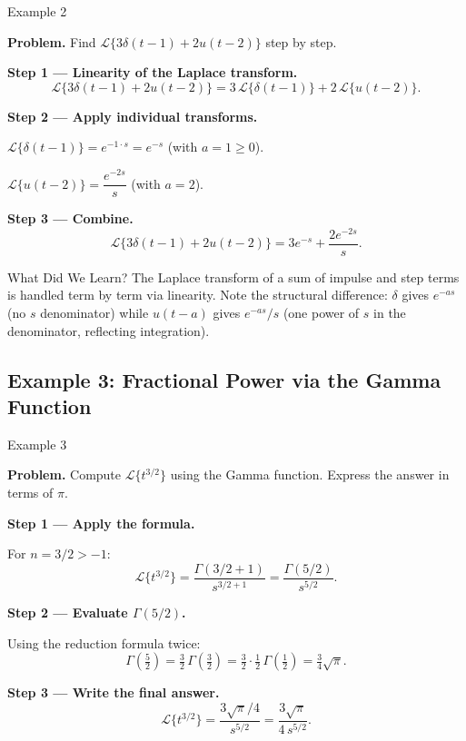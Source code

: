 \documentclass[12pt,a4paper]{article}
\begin{document}
\begin{infobox}{Example 2}

\textbf{Problem.} Find $\mathcal{L}\{3\delta(t-1) + 2u(t-2)\}$ step by step.

\medskip
\textbf{Step 1 --- Linearity of the Laplace transform.}
\[
  \mathcal{L}\{3\delta(t-1) + 2u(t-2)\}
  = 3\,\mathcal{L}\{\delta(t-1)\} + 2\,\mathcal{L}\{u(t-2)\}.
\]

\textbf{Step 2 --- Apply individual transforms.}

$\mathcal{L}\{\delta(t-1)\} = e^{-1\cdot s} = e^{-s}$ (with $a = 1 \geq 0$).

$\mathcal{L}\{u(t-2)\} = \dfrac{e^{-2s}}{s}$ (with $a = 2$).

\textbf{Step 3 --- Combine.}
\[
  \mathcal{L}\{3\delta(t-1) + 2u(t-2)\}
  = 3e^{-s} + \dfrac{2e^{-2s}}{s}.
\]

\end{infobox}

\begin{learnbox}{What Did We Learn?}
The Laplace transform of a sum of impulse and step terms is handled term by
term via linearity. Note the structural difference: $\delta$ gives $e^{-as}$
(no $s$ denominator) while $u(t-a)$ gives $e^{-as}/s$ (one power of $s$ in
the denominator, reflecting integration).
\end{learnbox}

\subsection{Example 3: Fractional Power via the Gamma Function}

\begin{infobox}{Example 3}

\textbf{Problem.} Compute $\mathcal{L}\{t^{3/2}\}$ using the Gamma function.
Express the answer in terms of $\pi$.

\medskip
\textbf{Step 1 --- Apply the formula.}

For $n = 3/2 > -1$:
\[
  \mathcal{L}\{t^{3/2}\} = \frac{\Gamma(3/2 + 1)}{s^{3/2+1}}
  = \frac{\Gamma(5/2)}{s^{5/2}}.
\]

\textbf{Step 2 --- Evaluate $\Gamma(5/2)$.}

Using the reduction formula twice:
\[
  \Gamma\!\left(\tfrac{5}{2}\right)
  = \tfrac{3}{2}\,\Gamma\!\left(\tfrac{3}{2}\right)
  = \tfrac{3}{2}\cdot\tfrac{1}{2}\,\Gamma\!\left(\tfrac{1}{2}\right)
  = \tfrac{3}{4}\sqrt{\pi}.
\]

\textbf{Step 3 --- Write the final answer.}
\[
  \mathcal{L}\{t^{3/2}\} = \dfrac{3\sqrt{\pi}/4}{s^{5/2}}
  = \boxed{\dfrac{3\sqrt{\pi}}{4\,s^{5/2}}}.
\]

\end{infobox}
\end{document}

